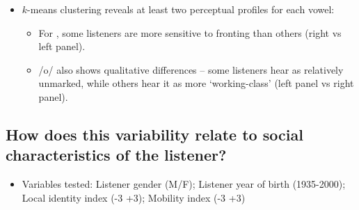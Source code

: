 \documentclass[a0,portrait]{a0poster}
\begin{document}
\begin{multicols}{4}
\begin{itemize}
\item{$k$-means clustering reveals at least two perceptual profiles for each vowel:\begin{itemize}\item{For , some listeners are more sensitive to fronting than others (right vs left panel).}\item{/o/ also shows qualitative differences -- some listeners hear \textipa{[\o:]} as relatively unmarked, while others hear it as more `working-class' (left panel vs right panel).}\end{itemize}}
\end{itemize}
\columnbreak
\subsection*{How does this variability relate to social characteristics of the listener?}
\begin{itemize}
\item{Variables tested: Listener gender (M/F); Listener year of birth (1935-2000); Local identity index (-3 +3); Mobility index (-3 +3)}
\end{itemize}
\vspace*{-1cm}

\end{multicols}
\end{document}
